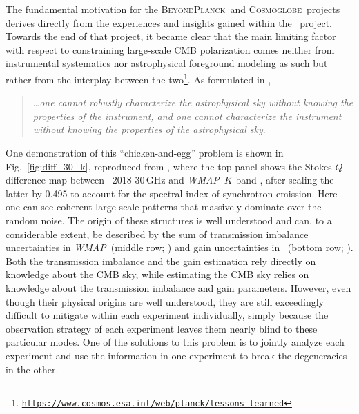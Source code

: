 \documentclass[twocolumn]{openjournal}
\def\WMAP{\textit{WMAP}}
\newcommand{\BP}{\textsc{BeyondPlanck}}
\newcommand{\cosmoglobe}{\textsc{Cosmoglobe}}
\begin{document}
The fundamental motivation for the \BP\ and \cosmoglobe\ projects derives
directly from the experiences and insights gained within the \Planck\ project.
Towards the end of that project, it became clear that the main limiting factor
with respect to constraining large-scale CMB polarization comes neither from
instrumental systematics nor astrophysical foreground modeling as such but
rather from the interplay between the two\footnote{
  \href{https://www.cosmos.esa.int/web/planck/lessons-learned}
  {\texttt{https://www.cosmos.esa.int/web/planck/lessons-learned}}}. As
formulated in \citet{bp01}, \begin{quotation}
\ldots \emph{one cannot robustly characterize the astrophysical sky without
  knowing the properties of the instrument, and one cannot
  characterize the instrument without knowing the properties of the
  astrophysical sky}.
\end{quotation}

One demonstration of this ``chicken-and-egg'' problem is shown in
Fig.~\ref{fig:diff_30_k}, reproduced from \citet{bp07}, where the top panel
shows the Stokes $Q$ difference map between \Planck\ 2018 30\,GHz
\citep{planck2016-l02} and \WMAP\ $K$-band \citep{bennett2012}, after scaling
the latter by 0.495 to account for the spectral index of synchrotron emission.
Here one can see coherent large-scale patterns that massively dominate over the
random noise. The origin of these structures is well understood and can, to a
considerable extent, be described by the sum of transmission imbalance
uncertainties in \WMAP\ (middle row; \citealp{jarosik2007}) and gain
uncertainties in \Planck\ (bottom row; \citealp{planck2016-l02}). Both the
transmission imbalance and the gain estimation rely directly on knowledge about
the CMB sky, while estimating the CMB sky relies on knowledge about the
transmission imbalance and gain parameters. However, even though their physical
origins are well understood, they are still exceedingly difficult to mitigate
within each experiment individually, simply because the observation strategy of
each experiment leaves them nearly blind to these particular modes. One of the
solutions to this problem is to jointly analyze each experiment and use the
information in one experiment to break the degeneracies in the other.
\end{document}
